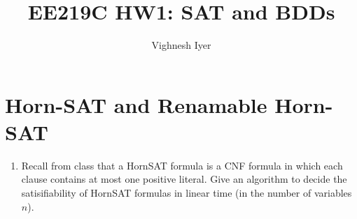

\title{EE219C HW1: SAT and BDDs}
\author{Vighnesh Iyer}
\date{}
\maketitle

\section{Horn-SAT and Renamable Horn-SAT}
\begin{enumerate}[label=(\alph*)]
    \item {\color{blue}Recall from class that a HornSAT formula is a CNF formula in which each clause contains at most one positive literal. Give an algorithm to decide the satisifiability of HornSAT formulas in linear time (in the number of variables $n$).}
\end{enumerate}

